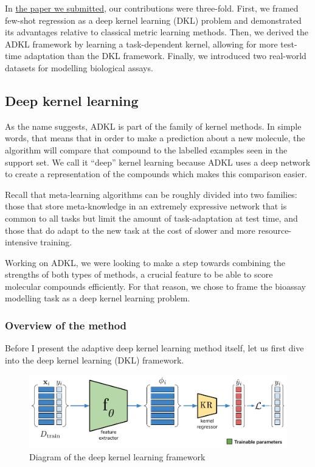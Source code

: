 \documentclass[11pt]{article}
\numberwithin{equation}{subsection}
\begin{document}

In \href{https://openreview.net/pdf?id=Syeu8CNYvS}{the paper we submitted}, our contributions were three-fold. First, we framed few-shot regression as a deep kernel learning (DKL) problem and demonstrated its advantages relative to classical metric learning methods.
Then, we derived the ADKL framework by learning a task-dependent kernel, allowing for more test-time adaptation than the DKL framework.
Finally, we introduced two real-world datasets for modelling biological assays.


\subsection{Deep kernel learning}

As the name suggests, ADKL is part of the family of kernel methods. In simple words, that means that in order to make a prediction about a new molecule, the algorithm will compare that compound to the labelled examples seen in the support set. We call it ``deep'' kernel learning because ADKL uses a deep network to create a representation of the compounds which makes this comparison easier.

Recall that meta-learning algorithms can be roughly divided into two families: those that store meta-knowledge in an extremely expressive network that is common to all tasks but limit the amount of task-adaptation at test time, and those that do adapt to the new task at the cost of slower and more resource-intensive training.

Working on ADKL, we were looking to make a step towards combining the strengths of both types of methods, a crucial feature to be able to score molecular compounds efficiently. For that reason, we chose to frame the bioassay modelling task as a deep kernel learning problem.


\subsubsection{Overview of the method}

Before I present the adaptive deep kernel learning method itself, let us first dive into the deep kernel learning (DKL) framework.

\begin{figure}[ht]
  \includegraphics[width=.9\textwidth,center]{adkl/dkl}
  \caption{Diagram of the deep kernel learning framework}
  \label{fig:dkl}
\end{figure}
\end{document}
